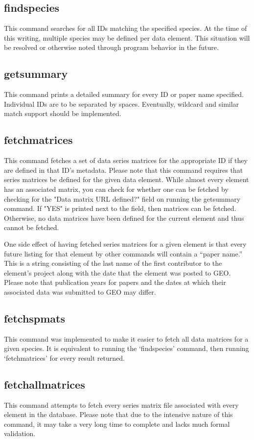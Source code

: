 \documentclass[12pt,letterpaper]{article}
\begin{document}
\subsection{findspecies}
This command searches for all IDs matching the specified species. At the time of this writing, multiple species may be defined per data element. This situation 
will be resolved or otherwise noted through program behavior in the future.

\subsection{getsummary}
This command prints a detailed summary for every ID or paper name specified. Individual IDs are to be separated by spaces. Eventually, wildcard and similar
match support should be implemented.

\subsection{fetchmatrices}
This command fetches a set of data series matrices for the appropriate ID if they are defined in that ID's metadata. Please note that this command requires that series matrices
be defined for the given data element. While almost every element has an associated matrix, you can check for whether one can be fetched by checking for the "Data matrix URL defined?"
field on running the getsummary command. If "YES" is printed next to the field, then matrices can be fetched. Otherwise, no data matrices have been defined for the current element
and thus cannot be fetched.

One side effect of having fetched series matrices for a given element is that every future listing for that element by other commands will contain a ``paper name.''
This is a string consisting of the last name of the first contributor to the element's project along with the date that the element was posted to GEO. Please
note that publication years for papers and the dates at which their associated data was submitted to GEO may differ.

\subsection{fetchspmats}
This command was implemented to make it easier to fetch all data matrices for a given species. It is equivalent to running the `findspecies' command, then running
`fetchmatrices' for every result returned.

\subsection{fetchallmatrices}
This command attempts to fetch every series matrix file associated with every element in the database. Please note that due to the intensive nature of this command,
it may take a very long time to complete and lacks much formal validation.
\end{document}
